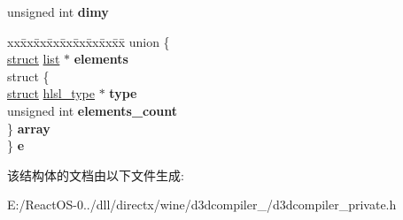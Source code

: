\begin{DoxyCompactItemize}
unsigned int {\bfseries dimy}
\item 
\mbox{\label{structhlsl__type_ac7bd65c15fb52727638329f82d7adf53}} 
\begin{tabbing}
xx\=xx\=xx\=xx\=xx\=xx\=xx\=xx\=xx\=\kill
union \{\\
\>\hyperlink{interfacestruct}{struct} \hyperlink{classlist}{list} $\ast$ {\bfseries elements}\\
\>struct \{\\
\>\>\hyperlink{interfacestruct}{struct} \hyperlink{structhlsl__type}{hlsl\_type} $\ast$ {\bfseries type}\\
\>\>unsigned int {\bfseries elements\_count}\\
\>\} {\bfseries array}\\
\} {\bfseries e}\\

\end{tabbing}\end{DoxyCompactItemize}


该结构体的文档由以下文件生成\+:\begin{DoxyCompactItemize}
\item 
E\+:/\+React\+O\+S-\/0../dll/directx/wine/d3dcompiler\+\_/d3dcompiler\+\_\+private.\+h\end{DoxyCompactItemize}
